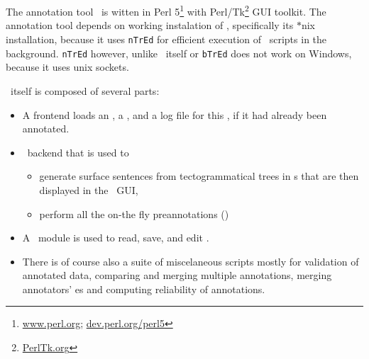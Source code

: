 
\section{\seman}
\label{sec:seman}
The annotation tool \seman\ is witten in Perl 5\footnote{\url{www.perl.org}; \url{dev.perl.org/perl5}} with Perl/Tk\footnote{\url{PerlTk.org}} GUI toolkit. The annotation tool depends on working instalation of \tred, specifically its $\ast$nix installation, because it uses \texttt{nTrEd} for efficient execution of \tred\ scripts in the background. \texttt{nTrEd} however, unlike \tred\ itself or \texttt{bTrEd} does not work on Windows, because it uses unix sockets.

 \seman\ itself is composed of several parts:
\begin{itemize}
\item A frontend loads an \sf, a \semlex,  and a log file for this \sf, if it had already been annotated. 
\item \ntred\ backend that is used to 
	\begin{itemize}
	\item generate surface sentences from tectogrammatical trees in \tf{}s that are then displayed in the \seman\ GUI,
	\item perform all the on-the fly preannotations ()
	\end{itemize}
\item A \semlex\ module is used to read, save, and edit \semlex.
\item There is of course also a suite of miscelaneous scripts mostly for validation of annotated data, comparing and merging multiple annotations, merging annotators' \semlex{}es and computing reliability of annotations.
\end{itemize}

